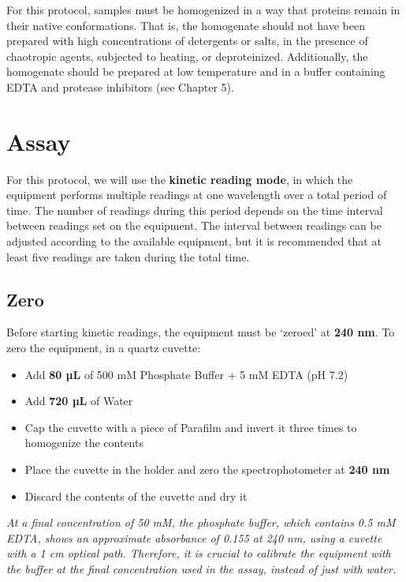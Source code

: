 \documentclass[
  9pt,
  american,
  a5paper,
  extrafontsizes,onecolumn,openright
  ]{memoir}
\providecommand{\tightlist}{%
  \setlength{\itemsep}{0pt}\setlength{\parskip}{0pt}}
\newlength{\rf}
\begin{document}
For this protocol, samples must be homogenized in a way that proteins remain in their native conformations. That is, the homogenate should not have been prepared with high concentrations of detergents or salts, in the presence of chaotropic agents, subjected to heating, or deproteinized. Additionally, the homogenate should be prepared at low temperature and in a buffer containing EDTA and protease inhibitors (see Chapter 5).

\section{Assay}\label{assay_general}

For this protocol, we will use the \textbf{kinetic reading mode}, in which the equipment performs multiple readings at one wavelength over a total period of time. The number of readings during this period depends on the time interval between readings set on the equipment. The interval between readings can be adjusted according to the available equipment, but it is recommended that at least five readings are taken during the total time.

\subsection{Zero}\label{cat_zero}

Before starting kinetic readings, the equipment must be \enquote*{zeroed} at \textbf{240 nm}. To zero the equipment, in a quartz cuvette:

\begin{itemize}
\tightlist
\item
  Add \textbf{80 µL} of 500 mM Phosphate Buffer + 5 mM EDTA (pH 7.2)
\item
  Add \textbf{720 µL} of Water
\item
  Cap the cuvette with a piece of Parafilm and invert it three times to homogenize the contents
\item
  Place the cuvette in the holder and zero the spectrophotometer at \textbf{240 nm}
\item
  Discard the contents of the cuvette and dry it
\end{itemize}

\begin{greybox}[frametitle = Note]
\emph{At a final concentration of 50 mM, the phosphate buffer, which contains 0.5 mM EDTA, shows an approximate absorbance of 0.155 at 240 nm, using a cuvette with a 1 cm optical path. Therefore, it is crucial to calibrate the equipment with the buffer at the final concentration used in the assay, instead of just with water.}

\end{greybox}
\end{document}
